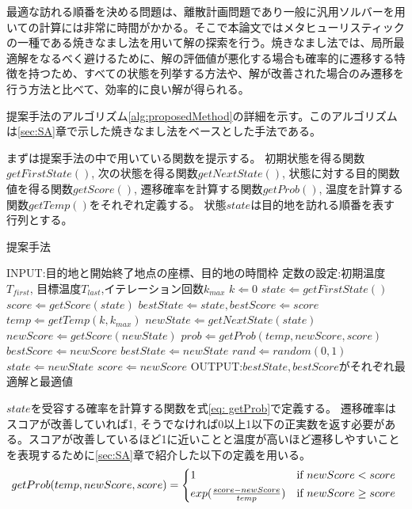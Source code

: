 \documentclass[11pt,a4paper,dvipdfmx,titlepage,uplatex]{jsarticle}
\theoremstyle{mystyle}
\newcommand{\0}{\mathbf{0}}
\begin{document}
	最適な訪れる順番を決める問題は、離散計画問題であり一般に汎用ソルバーを用いての計算には非常に時間がかかる。そこで本論文ではメタヒューリスティックの一種である焼きなまし法を用いて解の探索を行う。焼きなまし法では、局所最適解をなるべく避けるために、解の評価値が悪化する場合も確率的に遷移する特徴を持つため、すべての状態を列挙する方法や、解が改善された場合のみ遷移を行う方法と比べて、効率的に良い解が得られる。
	
	提案手法のアルゴリズム\ref{alg:proposedMethod}の詳細を示す。このアルゴリズムは\ref{sec:SA}章で示した焼きなまし法をベースとした手法である。
	
	まずは提案手法の中で用いている関数を提示する。
	初期状態を得る関数$getFirstState()$, 次の状態を得る関数$getNextState()$, 状態に対する目的関数値を得る関数$getScore()$, 遷移確率を計算する関数$getProb()$, 温度を計算する関数$getTemp()$をそれぞれ定義する。
	状態$state$は目的地を訪れる順番を表す行列とする。
	
	\begin{algorithm}[tb]
		\caption{提案手法}
		\label{alg:proposedMethod}
		\begin{algorithmic}[1]
			\STATE INPUT:目的地と開始終了地点の座標、目的地の時間枠
			\STATE 定数の設定:初期温度$T_{first}$, 目標温度$T_{last}$,イテレーション回数$k_{max}$
			\STATE $k \Leftarrow 0$
			\STATE $state \Leftarrow getFirstState()$
			\STATE $score \Leftarrow getScore(state)$
			\STATE $bestState \Leftarrow state, bestScore \Leftarrow score$
			\STATE $temp \Leftarrow getTemp(k, k_{max})$
			\STATE $newState \Leftarrow getNextState(state)$
			\STATE$ newScore \Leftarrow getScore(newState)$
			\STATE $prob \Leftarrow getProb(temp,newScore,score)$
			\STATE $bestScore\Leftarrow newScore$
			\STATE $bestState \Leftarrow newState$
			\ENDIF
			\STATE $rand \Leftarrow random(0,1)$
			\STATE $state \Leftarrow newState$
			\STATE $score  \Leftarrow  newScore$
			\ENDIF
			\ENDWHILE
			\ENDWHILE
			\STATE OUTPUT:$bestState, bestScore$がそれぞれ最適解と最適値
		\end{algorithmic}
	\end{algorithm}
	
	$ state$を受容する確率を計算する関数を式\ref{eq: getProb}で定義する。
	遷移確率はスコアが改善していれば1, そうでなければ0以上1以下の正実数を返す必要がある。スコアが改善しているほど1に近いことと温度が高いほど遷移しやすいことを表現するために\ref{sec:SA}章で紹介した以下の定義を用いる。
	\begin{equation}  
		getProb(temp,newScore,score)=
		\begin{cases*}
			1   &   if\ $newScore<score$  \\
			exp (\frac{score-newScore}{temp})     &   if\ $newScore\geq score$ 
		\end{cases*}
		\label{eq: getProb}
	\end{equation}
	
\end{document}
